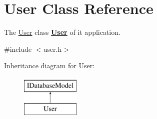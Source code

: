 \hypertarget{classUser}{\section{User Class Reference}
\label{classUser}
}


The \hyperlink{classUser}{User} class {\bfseries \hyperlink{classUser}{User}} of it application.  




{\ttfamily \#include $<$user.\+h$>$}

Inheritance diagram for User\+:\begin{figure}[H]
\begin{center}
\leavevmode
\includegraphics[height=2.000000cm]{d9/dc0/classUser}
\end{center}
\end{figure}
